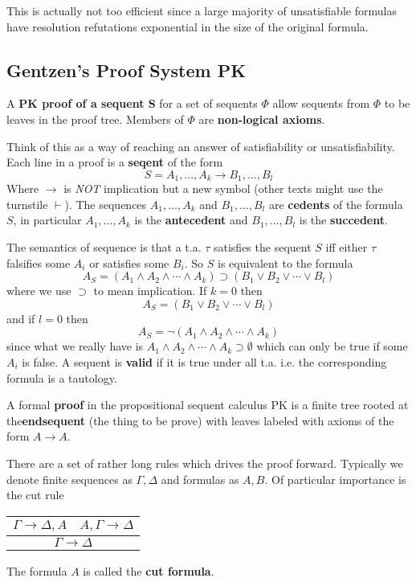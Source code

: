 \documentclass[twoside]{article}
\begin{document}
This is actually not too efficient since a large majority of unsatisfiable formulas have resolution refutations exponential in the size of the original formula.  

\subsection{Gentzen's Proof System PK}
A \textbf{PK proof of a sequent S} for a set of sequents $\Phi$ allow sequents from $\Phi$ to be leaves in the proof tree. Members of $\Phi$ are \textbf{non-logical axioms}. 

Think of this as a way of reaching an answer of satisfiability or unsatisfiability. Each line in a proof is a \textbf{seqent} of the form
\[S = A_1, ..., A_k \rightarrow B_1, ..., B_l\]
Where $\rightarrow$ is \emph{NOT} implication but a new symbol (other texts might use the turnstile $\vdash$). The sequences $A_1, ..., A_k$ and $B_1, ..., B_l$ are \textbf{cedents} of the formula $S$, in particular $A_1, ..., A_k$ is the \textbf{antecedent} and $B_1, ..., B_l$ is the \textbf{succedent}.

The semantics of sequence is that a t.a. $\tau$ satisfies the sequent $S$ iff either $\tau$ falsifies some $A_i$ or satisfies some $B_i$. So $S$ is equivalent to the formula
\[A_S = (A_1 \land A_2 \land \cdots \land A_k) \supset (B_1 \lor B_2 \lor \cdots \lor B_l)\]
where we use $\supset$ to mean implication. If $k = 0$ then
\[A_S = (B_1 \lor B_2 \lor \cdots \lor B_l)\]
and if $l = 0$ then 
\[A_S = \lnot(A_1 \land A_2 \land \cdots \land A_k)\]    
since what we really have is $A_1 \land A_2 \land \cdots \land A_k \supset \emptyset$ which can only be true if some $A_i$ is false. A sequent is \textbf{valid} if it is true under all t.a. i.e. the corresponding formula is a tautology. 

A formal \textbf{proof} in the propositional sequent calculus PK is a finite tree rooted at the\textbf{endsequent} (the thing to be prove) with leaves labeled with axioms of the form $A \rightarrow A$.

There are a set of rather long rules which drives the proof forward. Typically we denote finite sequences as $\Gamma, \Delta$ and formulas as $A, B$. Of particular importance is the cut rule

\begin{tabular}{c}
$\Gamma \rightarrow \Delta, A \quad A, \Gamma \rightarrow \Delta$ \\
\hline
$\Gamma \rightarrow \Delta$ \\
\end{tabular}
The formula $A$ is called the \textbf{cut formula}. 
\end{document}
